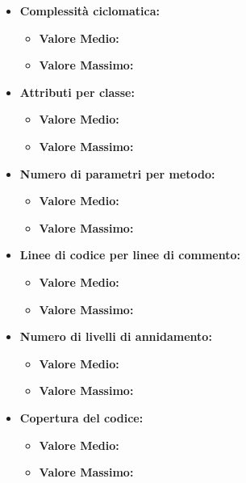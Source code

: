 \begin{itemize}

	\item \textbf{Complessità ciclomatica:}
	\begin{itemize}
		\item \textbf{Valore Medio:}
		\item \textbf{Valore Massimo:}
	\end{itemize}



	\item \textbf{Attributi per classe:}
	\begin{itemize}
		\item \textbf{Valore Medio:}
		\item \textbf{Valore Massimo:}
	\end{itemize}



	\item \textbf{Numero di parametri per metodo:}
	\begin{itemize}
		\item \textbf{Valore Medio:}
		\item \textbf{Valore Massimo:}
	\end{itemize}



	\item \textbf{Linee di codice per linee di commento:}
	\begin{itemize}
		\item \textbf{Valore Medio:}
		\item \textbf{Valore Massimo:}
	\end{itemize}



	\item \textbf{Numero di livelli di annidamento:}
	\begin{itemize}
		\item \textbf{Valore Medio:}
		\item \textbf{Valore Massimo:}
	\end{itemize}



	\item \textbf{Copertura del codice:}
	\begin{itemize}
		\item \textbf{Valore Medio:}
		\item \textbf{Valore Massimo:}
	\end{itemize}


\end{itemize}